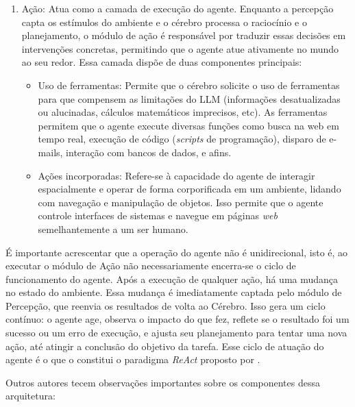 \documentclass[12pt,oneside,a4paper,brazil,sumario=tradicional]{abntex2}
\begin{document}
\begin{enumerate}
\begin{itemize}
  \item Planejamento: Após a recuperação de memórias e reflexões, o cérebro traduz essas informações, juntamente com o estado do ambiente, em um plano de ação em níveis macro e micro, mecanismo que permite que os agentes coordenem comportamentos complexos de forma autônoma.
  \end{itemize}
  \item Ação: Atua como a camada de execução do agente. Enquanto a percepção capta os estímulos do ambiente e o cérebro processa o raciocínio e o planejamento, o módulo de ação é responsável por traduzir essas decisões em intervenções concretas, permitindo que o agente atue ativamente no mundo ao seu redor. Essa camada dispõe de duas componentes principais:
  \begin{itemize}
  \item Uso de ferramentas: Permite que o cérebro solicite o uso de ferramentas para que compensem as limitações do LLM (informações desatualizadas ou alucinadas, cálculos matemáticos imprecisos, etc). As ferramentas permitem que o agente execute diversas funções como busca na web em tempo real, execução de código (\textit{scripts }de programação), disparo de e-mails, interação com bancos de dados, e afins.
  \item Ações incorporadas: Refere-se à capacidade do agente de interagir espacialmente e operar de forma corporificada em um ambiente, lidando com navegação e manipulação de objetos. Isso permite que o agente controle interfaces de sistemas e navegue em páginas \textit{web }semelhantemente a um ser humano.
  \end{itemize}
\end{enumerate}

É importante acrescentar que a operação do agente não é unidirecional, isto é, ao executar o módulo de Ação não necessariamente encerra-se o ciclo de funcionamento do agente.  Após a execução de qualquer ação, há uma mudança no estado do ambiente. Essa mudança é imediatamente captada pelo módulo de Percepção, que reenvia os resultados de volta ao Cérebro. Isso gera um ciclo contínuo: o agente age, observa o impacto do que fez, reflete se o resultado foi um sucesso ou um erro de execução, e ajusta seu planejamento para tentar uma nova ação, até atingir a conclusão do objetivo da tarefa. Esse ciclo de atuação do agente é o que o constitui o paradigma \textit{ReAct }proposto por \textcite{yao2022}.

Outros autores tecem observações importantes sobre os componentes dessa arquitetura:
\end{document}
